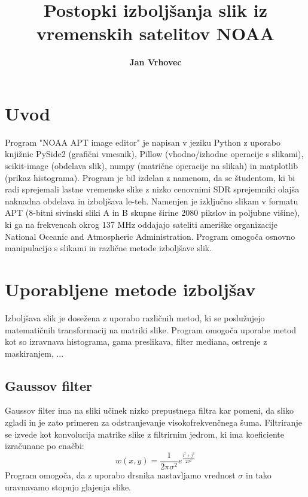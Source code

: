 \documentclass[a4paper, twocolumn]{article}
\begin{document}

	\title{	\textbf{Postopki izboljšanja slik iz vremenskih satelitov NOAA}}
	
	\author[1]{\textbf{Jan Vrhovec}}
	\date{}
	\maketitle
	

\section{Uvod}

Program "NOAA APT image editor" je napisan v jeziku Python z uporabo knjižnic PySide2 (grafični vmesnik), Pillow (vhodno/izhodne operacije s slikami), scikit-image (obdelava slik), numpy (matrične operacije na slikah) in matplotlib (prikaz histograma). Program je bil izdelan z namenom, da se študentom, ki bi radi sprejemali lastne vremenske slike z nizko cenovnimi SDR sprejemniki olajša naknadna obdelava in izboljšava le-teh. Namenjen je izključno slikam v formatu APT (8-bitni sivinski sliki A in B skupne širine 2080 pikslov in poljubne višine), ki ga na frekvencah okrog 137 MHz oddajajo sateliti ameriške organizacije National Oceanic and Atmospheric Administration. Program omogoča osnovno manipulacijo s slikami in različne metode izboljšave slik.


\section{Uporabljene metode izboljšav}
Izboljšava slik je dosežena z uporabo različnih metod, ki se poslužujejo matematičnih transformacij na matriki slike. Program omogoča uporabe metod kot so izravnava histograma, gama preslikava, filter mediana, ostrenje z maskiranjem, ...

\subsection{Gaussov filter}
Gaussov filter ima na sliki učinek nizko prepustnega filtra kar pomeni, da sliko zgladi in je zato primeren za odstranjevanje visokofrekvenčnega šuma. Filtriranje se izvede kot konvolucija matrike slike z filtrirnim jedrom, ki ima koeficiente izračunane po enačbi:
\begin{equation}
w(x,y)=\frac{1}{2 \pi {\sigma}^2} e^{\frac{i^2 + j^2}{2 \sigma^2}}
\end{equation}
Program omogoča, da z uporabo drsnika nastavljamo vrednost $\sigma$ in tako uravnavamo stopnjo glajenja slike.
\end{document}
